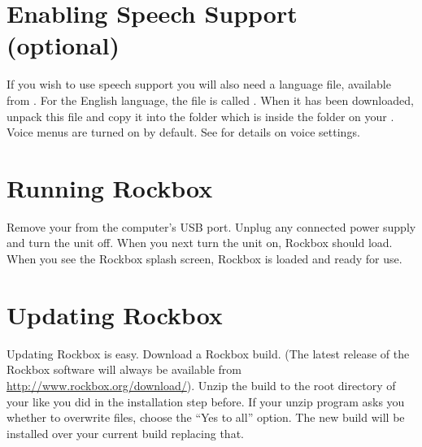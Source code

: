 %


\section{Enabling Speech Support (optional)}\label{sec:enabling_speech_support} 
If you wish to use speech support you will also need a language file, available
from .  For the English language, the file is called
. When it has been downloaded, unpack this file and copy it
into the  folder which is inside the  folder on
your \dap{}. Voice menus are turned on by default. See
 for details on voice settings.

\section{Running Rockbox} 
Remove your \dap{} from the computer's USB port. Unplug any connected power supply
and turn the unit off. When you next turn the unit on, Rockbox should load. When
you see the Rockbox splash screen, Rockbox is loaded and ready for use.


\section{Updating Rockbox} Updating Rockbox is easy. Download a Rockbox build.
(The latest release of the Rockbox software will always be available from 
\url{http://www.rockbox.org/download/}). Unzip the build to the root directory 
of your \dap{} like you did in the installation step before. If your unzip
program asks you whether to overwrite files, choose the ``Yes to all'' option.
The new build will be installed over your current build replacing that.


